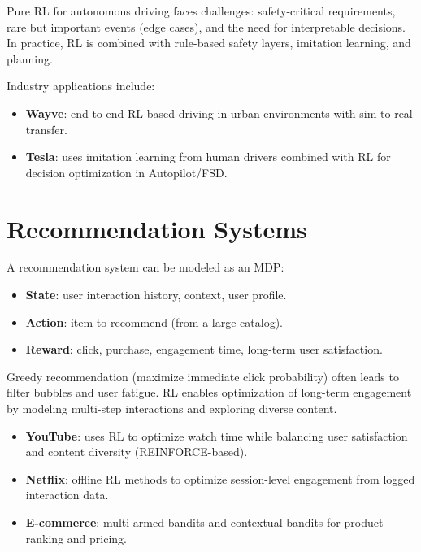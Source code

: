 \begin{remark}
Pure RL for autonomous driving faces challenges: safety-critical
requirements, rare but important events (edge cases), and the need for
interpretable decisions. In practice, RL is combined with rule-based
safety layers, imitation learning, and planning.
\end{remark}

\begin{example}
Industry applications include:
\begin{itemize}
    \item \textbf{Wayve}: end-to-end RL-based driving in urban
    environments with sim-to-real transfer.
    \item \textbf{Tesla}: uses imitation learning from human drivers
    combined with RL for decision optimization in Autopilot/FSD.
\end{itemize}
\end{example}

\section{Recommendation Systems}
\label{sec:app:recommender}

\begin{definition}
A recommendation system can be modeled as an MDP:
\begin{itemize}
    \item \textbf{State}: user interaction history, context, user profile.
    \item \textbf{Action}: item to recommend (from a large catalog).
    \item \textbf{Reward}: click, purchase, engagement time, long-term
    user satisfaction.
\end{itemize}
\end{definition}

\begin{proposition}
Greedy recommendation (maximize immediate click probability) often leads
to filter bubbles and user fatigue. RL enables optimization of
long-term engagement by modeling multi-step interactions and exploring
diverse content.
\end{proposition}

\begin{example}
\begin{itemize}
    \item \textbf{YouTube}: uses RL to optimize watch time while
    balancing user satisfaction and content diversity (REINFORCE-based).
    \item \textbf{Netflix}: offline RL methods to optimize
    session-level engagement from logged interaction data.
    \item \textbf{E-commerce}: multi-armed bandits and contextual
    bandits for product ranking and pricing.
\end{itemize}
\end{example}


